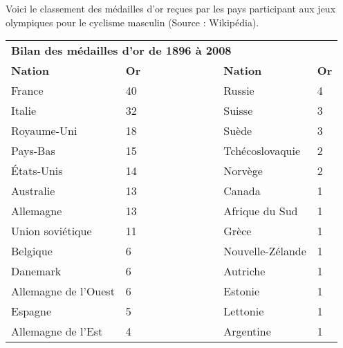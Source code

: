 
\medskip

Voici le classement des médailles d'or reçues par les pays participant aux jeux olympiques pour le cyclisme masculin (Source : Wikipédia). 
 
\begin{tabularx}{\linewidth}{|l X|l|l X|}
\multicolumn{5}{l}{\textbf{Bilan des médailles d'or de 1896 \`{a} 2008}}\\ \cline{1-2}\cline{4-5}
\textbf{Nation}&\textbf{Or}&&\textbf{Nation}&\textbf{Or}\\
France				&40&~~~~~~~~~~~	& Russie	& 	4\\ 
Italie				&32&	&Suisse 	&	3\\ 
Royaume-Uni			&18&	&Suède		& 	3 \\
Pays-Bas 			&15&	&Tchécoslovaquie& 	2\\
États-Unis 			&14&	&Norvège	& 	2\\
Australie 			&13&	&Canada		& 	1\\
Allemagne 			&13&	&Afrique du Sud &1\\
Union soviétique	&11&	&Grèce		&1\\
Belgique 			&6&	&Nouvelle-Zélande&1\\ 
Danemark 			&6&	&Autriche	&1\\
Allemagne de l'Ouest&6&	&Estonie	&1 \\
Espagne 			&5&	&Lettonie	&1\\ 
Allemagne de l'Est	&4&	&Argentine	&1\\ \cline{1-2}\cline{4-5}
\end{tabularx}

\bigskip
 
